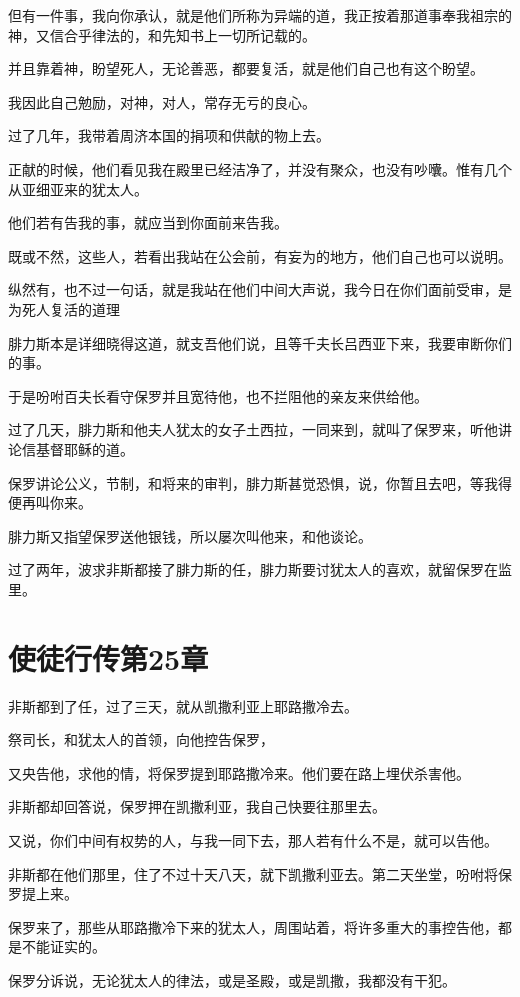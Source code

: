 \documentclass[12pt,oneside]{book}
\begin{document}
但有一件事，我向你承认，就是他们所称为异端的道，我正按着那道事奉我祖宗的神，又信合乎律法的，和先知书上一切所记载的。

并且靠着神，盼望死人，无论善恶，都要复活，就是他们自己也有这个盼望。

我因此自己勉励，对神，对人，常存无亏的良心。

过了几年，我带着周济本国的捐项和供献的物上去。

正献的时候，他们看见我在殿里已经洁净了，并没有聚众，也没有吵囔。惟有几个从亚细亚来的犹太人。

他们若有告我的事，就应当到你面前来告我。

既或不然，这些人，若看出我站在公会前，有妄为的地方，他们自己也可以说明。

纵然有，也不过一句话，就是我站在他们中间大声说，我今日在你们面前受审，是为死人复活的道理

腓力斯本是详细晓得这道，就支吾他们说，且等千夫长吕西亚下来，我要审断你们的事。

于是吩咐百夫长看守保罗并且宽待他，也不拦阻他的亲友来供给他。

过了几天，腓力斯和他夫人犹太的女子土西拉，一同来到，就叫了保罗来，听他讲论信基督耶稣的道。

保罗讲论公义，节制，和将来的审判，腓力斯甚觉恐惧，说，你暂且去吧，等我得便再叫你来。

腓力斯又指望保罗送他银钱，所以屡次叫他来，和他谈论。

过了两年，波求非斯都接了腓力斯的任，腓力斯要讨犹太人的喜欢，就留保罗在监里。

\chapter{使徒行传第25章}
非斯都到了任，过了三天，就从凯撒利亚上耶路撒冷去。

祭司长，和犹太人的首领，向他控告保罗，

又央告他，求他的情，将保罗提到耶路撒冷来。他们要在路上埋伏杀害他。

非斯都却回答说，保罗押在凯撒利亚，我自己快要往那里去。

又说，你们中间有权势的人，与我一同下去，那人若有什么不是，就可以告他。

非斯都在他们那里，住了不过十天八天，就下凯撒利亚去。第二天坐堂，吩咐将保罗提上来。

保罗来了，那些从耶路撒冷下来的犹太人，周围站着，将许多重大的事控告他，都是不能证实的。

保罗分诉说，无论犹太人的律法，或是圣殿，或是凯撒，我都没有干犯。
\end{document}
